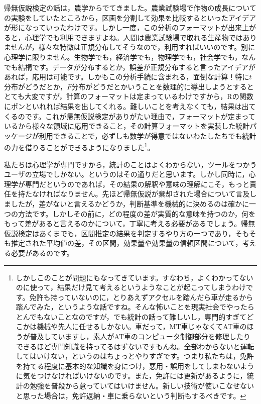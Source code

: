 \documentclass{ltjbook}
\begin{document}
帰無仮説検定の話は，農学からでてきました。農業試験場で作物の成長についての実験をしていたところから，区画を分割して効果を比較するといったアイデアが形になっていったわけです。しかし一度，この分析のフォーマットが出来上がると，心理学でも利用できますよね。人間は農業試験場で取れる生産物ではありませんが，様々な特徴は正規分布してそうなので，利用すればいいのです。別に心理学に限りません。生物学でも，経済学でも，物理学でも，社会学でも，なんでも結構です。データが分布するとか，誤差が正規分布すると言ったアイデアがあれば，応用は可能です。しかもこの分析手続に含まれる，面倒な計算！特に$t$分布がどうだとか，$F$分布がどうだとかいうことを数理的に導出しようとするととても大変ですが，計算のフォーマットは定まっているわけですから，Rの関数にポンといれれば結果を出してくれる。難しいことを考えなくても，結果は出てくるのです。これが帰無仮説検定がありがたい理由で，フォーマットが定まっているから様々な領域に応用できること，その計算フォーマットを実装した統計パッケージが利用できることで，必ずしも数学が得意ではないわたしたちでも統計の力を借りることができるようになりました\footnote{しかしこのことが問題にもなってきています。すなわち，よくわかってないのに使って，結果だけ見て考えるというようなことが起こってしまうわけです。免許も持っていないのに，とりあえずアクセルを踏んだら車が走るから踏んでみた，というような話ですね。そんな怖いことを現実社会でやったらとんでもないことなのですが，でも統計の話って難しいし，専門的すぎてどこかは機械や先人に任せるしかない。車だって，MT車じゃなくてAT車のほうが普及していますし，素人がAT車のコンピュータ制御部分を修理したりできるほど専門知識を持ってるはずないですもんね。全部わからないと運転してはいけない，というのはちょっとやりすぎです。つまり私たちは，免許を持てる程度に基本的な知識を身につけ，悪用・誤用をしてしまわないように気をつけなければいけないのです。また，免許には更新があるように，統計の勉強を普段から怠っていてはいけません。新しい技術が使いこなせないと思った場合は，免許返納・車に乗らないという判断もするべきです。}。

私たちは心理学が専門ですから，統計のことはよくわからない，ツールをつかうユーザの立場でしかない。というのはその通りだと思います。しかし同時に，心理学が専門だというのであれば，その結果の解釈や意味の理解にこそ，もっと責任を持たなければなりません。先ほど帰無仮説が棄却された場合について言及しましたが，差がないと言えるかどうか，判断基準を機械的に決めるのは確かに一つの方法です。しかしその前に，どの程度の差が実質的な意味を持つのか，何をもって差があると言えるのかについて，丁寧に考える必要があるでしょう。帰無仮説検定はあくまでも，区間推定の結果を判定するやり方の一つであり，そもそも推定された平均値の差，その区間，効果量や効果量の信頼区間について，考える必要があるのです。
\end{document}
